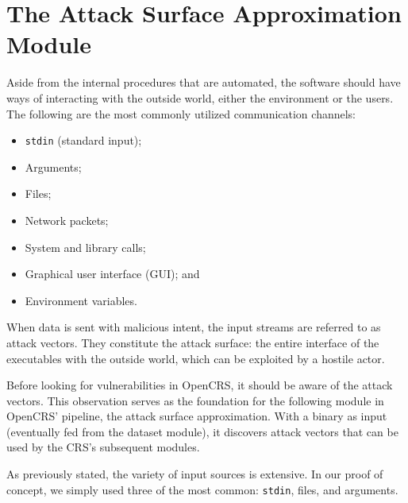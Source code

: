 \documentclass[../main.tex]{subfiles}
\begin{document}
\hypertarget{attack-surface-approximation-module}{%
\chapter{The Attack Surface Approximation
Module}\label{attack-surface-approximation-module}}

Aside from the internal procedures that are automated, the software
should have ways of interacting with the outside world, either the
environment or the users. The following are the most commonly utilized
communication channels:

\begin{itemize}
\tightlist
\item
  \texttt{stdin} (standard input);
\item
  Arguments;
\item
  Files;
\item
  Network packets;
\item
  System and library calls;
\item
  Graphical user interface (GUI); and
\item
  Environment variables.
\end{itemize}

When data is sent with malicious intent, the input streams are referred
to as attack vectors. They constitute the attack surface: the entire
interface of the executables with the outside world, which can be
exploited by a hostile actor.

Before looking for vulnerabilities in OpenCRS, it should be aware of the
attack vectors. This observation serves as the foundation for the
following module \cite{surface_module_repo} in OpenCRS' pipeline, the attack surface approximation.
With a binary as input (eventually fed from the dataset module), it
discovers attack vectors that can be used by the CRS's subsequent
modules.

As previously stated, the variety of input sources is extensive. In our
proof of concept, we simply used three of the most common:
\texttt{stdin}, files, and arguments.
\end{document}
